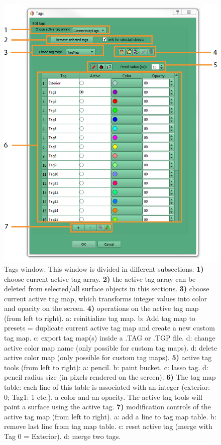 \begin{figure}
  \centering
  \includegraphics[scale=1]{images/12/tags_window2.png}
\caption{Tags window. This window is divided in different subsections. \textbf{1)} choose current active tag array.  \textbf{2)} the active tag array can be deleted from selected/all surface objects in this sections. \textbf{3)} choose current active tag map, which transforms integer values into color and opacity on the screen. \textbf{4)} operations on the active tag map (from left to right). a: reinitialize tag map. b: Add tag map to presets = duplicate current active tag map and create a new custom tag map. c: export tag map(s) inside a .TAG or .TGP file. d: change active color map name (only possible for custom tag maps). d: delete active color map (only possible for custom tag maps). \textbf{5)} active tag tools (from left to right): a: pencil. b: paint bucket. c: lasso tag. d: pencil radius size (in pixels rendered on the screen).  \textbf{6)} The tag map table: each line of this table is associated with an integer (exterior: 0; Tag1: 1 etc.), a color and an opacity. The active tag tools will paint a surface using the active tag. \textbf{7)} modification controls of the active tag map (from left to right). a: add a line to tag map table. b: remove last line from tag map table. c: reset active tag (merge with Tag 0 = Exterior). d: merge two tags.}	
\label{tags_window}
 \end{figure}


